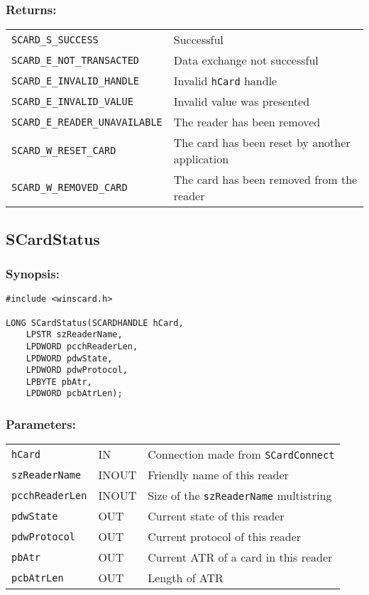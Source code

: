 \documentclass[a4paper,12pt]{article}
\newcommand{\synopsis}{\subsubsection{Synopsis:}}
\newcommand{\parameters}{\subsubsection{Parameters:}}
\newcommand{\returns}{\subsubsection{Returns:}}
\begin{document}
\returns

\begin{tabular}{ll}
\texttt{SCARD\_S\_SUCCESS}			& Successful\\
\texttt{SCARD\_E\_NOT\_TRANSACTED}		& Data exchange not successful\\
\texttt{SCARD\_E\_INVALID\_HANDLE}		& Invalid \texttt{hCard} handle\\
\texttt{SCARD\_E\_INVALID\_VALUE}		& Invalid value was presented\\
\texttt{SCARD\_E\_READER\_UNAVAILABLE} 	& The reader has been removed\\
\texttt{SCARD\_W\_RESET\_CARD}		& The card has been reset by another application\\
\texttt{SCARD\_W\_REMOVED\_CARD}		& The card has been removed from the reader\\
\end{tabular}


\subsection{SCardStatus}

\synopsis

\begin{verbatim}
#include <winscard.h>

LONG SCardStatus(SCARDHANDLE hCard,
    LPSTR szReaderName,
    LPDWORD pcchReaderLen,
    LPDWORD pdwState,
    LPDWORD pdwProtocol,
    LPBYTE pbAtr,
    LPDWORD pcbAtrLen);
\end{verbatim}

\parameters

\begin{tabular}{lll}
\texttt{hCard} &			IN &	Connection made from \texttt{SCardConnect} \\
\texttt{szReaderName} &		INOUT &	Friendly name of this reader\\
\texttt{pcchReaderLen} &		INOUT &	Size of the \texttt{szReaderName} multistring\\
\texttt{pdwState} &		OUT &	Current state of this reader\\
\texttt{pdwProtocol} &		OUT &	Current protocol of this reader\\
\texttt{pbAtr} &			OUT &	Current ATR of a card in this reader\\
\texttt{pcbAtrLen} &		OUT &	Length of ATR\\
\end{tabular}
\end{document}
